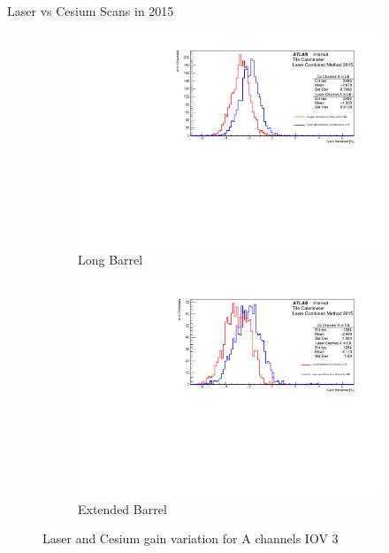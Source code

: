 \documentclass{beamer}
\begin{document}
\begin{frame}{Laser vs Cesium Scans in 2015}
\begin{figure}[H]
\centering
\begin{subfigure} [t] {0.49\textwidth}
\includegraphics[width=\textwidth]{cs1d_a_lb_iov3.pdf}
\caption{Long Barrel}
\end{subfigure}
\begin{subfigure} [t] {0.49\textwidth}
\includegraphics[width=\textwidth]{cs1d_a_eb_iov3.pdf}
\caption{Extended Barrel}
\end{subfigure}
\caption{Laser and Cesium gain variation for A channels IOV 3}
\end{figure}
\end{frame}
\end{document}

